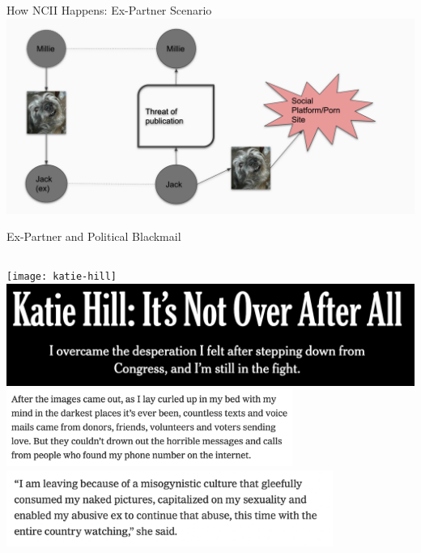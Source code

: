 \documentclass[nobackground,dvipsnames,table,aspectratio=169]{beamer}
\begin{document}
\begin{frame}{How NCII Happens: Ex-Partner Scenario}
    \includegraphics[width=\textwidth]{ex-partner-ncii-diagram-4}
\end{frame}

\begin{frame}{Ex-Partner and Political Blackmail}
    \begin{columns}
            \texttt{[image: katie-hill]}
            \centering
            \includegraphics[width=\textwidth]{katie-hill-article-1}
            \includegraphics[width=0.7\textwidth]{katie-hill-article-2}
            \includegraphics[width=0.8\textwidth]{katie-hill-article-4}
    \end{columns}
\end{frame}
\end{document}
